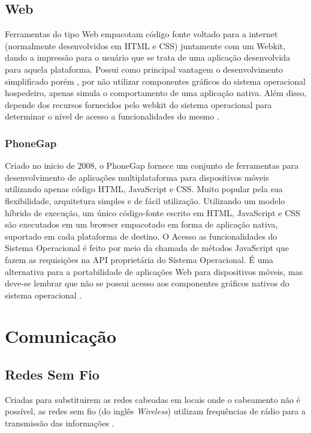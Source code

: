 \subsection{Web}
Ferramentas do tipo Web empacotam código fonte voltado para a internet (normalmente desenvolvidos em HTML e CSS) juntamente com um Webkit, dando a impressão para o usuário que se trata de uma aplicação desenvolvida para aquela plataforma. Possui como principal vantagem o desenvolvimento simplificado porém , por não utilizar componentes gráficos do sistema operacional hospedeiro, apenas simula o comportamento de uma aplicação nativa. Além disso, depende dos recursos fornecidos pelo webkit do sistema operacional para determinar o nível de acesso a funcionalidades do mesmo 
\cite{CrossPlatformMobileDevelopment2011}.

\subsubsection{PhoneGap}
Criado no inicio de 2008, o PhoneGap fornece um conjunto de ferramentas para desenvolvimento de aplicações multiplataforma para dispositivos móveis utilizando apenas código HTML, JavaScript e CSS. Muito popular pela sua flexibilidade, arquitetura simples e de fácil utilização. Utilizando um modelo híbrido de execução, um único código-fonte escrito em HTML, JavaScript e CSS são executados em um browser empacotado em forma de aplicação nativa, suportado em cada plataforma de destino. O Acesso as funcionalidades do Sistema Operacional é feito por meio da chamada de métodos JavaScript que fazem as requisições na API proprietária do Sistema Operacional. É uma alternativa para a portabilidade de aplicações Web para dispositivos móveis, mas deve-se lembrar que não se possui acesso aos componentes gráficos nativos do sistema operacional
\cite{CrossPlatformMobileDevelopment2011}.

\section{Comunicação}

\subsection{Redes Sem Fio}
Criadas para substituirem as redes cabeadas em locais onde o cabeamento não é possível, as redes sem fio (do inglês \emph{Wireless}) utilizam frequências de rádio para a transmissão das informações \cite{RedesSemFioUFLA}.

